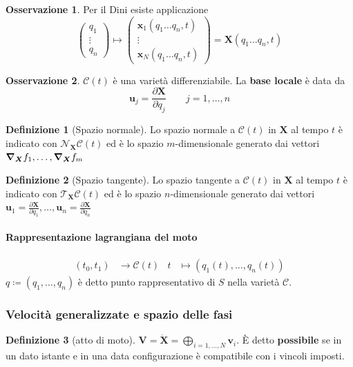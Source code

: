\documentclass[a4paper,10pt]{article}
\theoremstyle{definition}
\newcommand{\bv}{\boldsymbol} %
\newcommand{\cvv}[3]{\begin{pmatrix} #1 \\ #2 \\ #3 \end{pmatrix}} %
\theoremstyle{indentdefinition}
\newtheorem{defn}{Definizione}[section]
\theoremstyle{indenttheorem}
\theoremstyle{myremark}
\newtheorem*{rem*}{Osservazione}
\theoremstyle{indentgeneral}
\begin{document}
\begin{rem*}
    Per il Dini esiste applicazione 
    $$\cvv{q_1}{\vdots}{q_n}\mapsto\cvv{\bv{x}_1(q_1\dots q_n,t)}{\vdots}{\bv{x}_N(q_1\dots q_n,t)}=\bv{X}(q_1\dots q_n,t)$$
\end{rem*}

\begin{rem*}
    $\mathcal{C}(t)$ è una varietà differenziabile. La \textbf{base locale} è data da 
    $$\bv{u}_j=\frac{\partial \bv{X}}{\partial q_j} \quad\quad j=1,\dots, n$$
\end{rem*}

\begin{defn}[Spazio normale]
    Lo spazio normale a $\mathcal{C}(t)$ in $\bv{X}$ al tempo $t$ è indicato con $\mathcal{N}_{\bv{X}}\mathcal{C}(t)$ ed è lo spazio $m$-dimensionale generato dai vettori $\grad_{\bv{X}}f_1,\dots,\grad_{\bv{X}}f_m$
\end{defn}

\begin{defn}[Spazio tangente]
     Lo spazio tangente a $\mathcal{C}(t)$ in $\bv{X}$ al tempo $t$ è indicato con $\mathcal{T}_{\bv{X}}\mathcal{C}(t)$ ed è lo spazio $n$-dimensionale generato dai vettori $\bv{u}_1=\frac{\partial \bv{X}}{\partial q_1},\dots,\bv{u}_n=\frac{\partial \bv{X}}{\partial q_n}$
\end{defn}



\paragraph{Rappresentazione lagrangiana del moto} 
\begin{align*}
\left(t_{0},t_{1}\right) & \longrightarrow\mathcal{C}\left(t\right) & t & \longmapsto\left(q_{1}\left(t\right),\ldots,q_{n}\left(t\right)\right)
\end{align*}
$q\coloneqq\left(q_{1},\ldots,q_{n}\right)$ è detto punto rappresentativo
di $S$ nella varietà $\mathcal{C}$.


\subsubsection{Velocità generalizzate e spazio delle fasi}
\begin{defn}[atto di moto]
\label{def:atto-di-moto}$\boldsymbol{V}=\dot{\boldsymbol{X}}=\bigoplus_{i=1,\ldots,N}\boldsymbol{v}_{i}$.
È detto \textbf{possibile} se in un dato istante e in una data configurazione
è compatibile con i vincoli imposti.
\end{defn}
\end{document}
